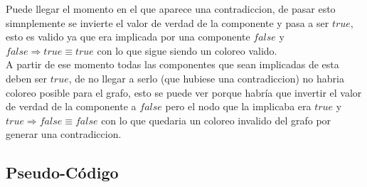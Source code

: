 
Puede llegar el momento en el que aparece una contradiccion, de pasar esto simnplemente se invierte el valor de verdad de la componente y pasa a ser $true$, esto es valido ya que era implicada por una componente $false$ y $false \Rightarrow true \equiv true$ con lo que sigue siendo un coloreo valido. \\


A partir de ese momento todas las componentes que sean implicadas de esta deben ser $true$, de no llegar a serlo (que hubiese una contradiccion) no habria coloreo posible para el grafo, esto se puede ver porque habr\'ia que invertir el valor de verdad de la componente a $false$ pero el nodo que la implicaba era $true$ y $true \Rightarrow false \equiv false$ con lo que quedaria un coloreo invalido del grafo por generar una contradiccion.   

\pagebreak

\subsection{Pseudo-C\'odigo}

